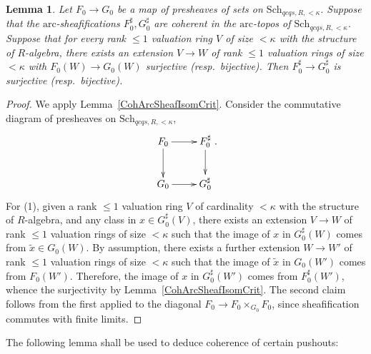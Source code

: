 \documentclass[reqno]{amsart}
\newcommand{\arc}{\mathrm{arc}}
\newtheorem{lemma}[theorem]{Lemma}
\theoremstyle{definition}
\begin{document}
\begin{lemma} 
Let $F_0 \to G_0$ be a map of presheaves of sets on
$\mathrm{Sch}_{qcqs,R, <\kappa}$. Suppose that the $\arc$-sheafifications $F_0^{\sharp},
G_0^{\sharp}$ are coherent in the $\arc$-topos of $\mathrm{Sch}_{qcqs,R, <
\kappa}$. 
Suppose that
for every rank $\leq 1$ valuation 
ring $V$ of size $< \kappa$ with the structure of $R$-algebra, there exists an
extension $V \to W$ of rank $\leq 1$ valuation rings of size $<\kappa$ with
$F_0(W)
\to G_0(W)$ surjective (resp.~bijective). Then $F_0^{\sharp} \to G_0^{\sharp}$
is surjective (resp.~bijective). 
\label{ArcPresheafSheafCrit}
\end{lemma} 
\begin{proof} 
We apply 
Lemma~\ref{CohArcSheafIsomCrit}. 
Consider the commutative diagram of presheaves on 
$\mathrm{Sch}_{qcqs, R, < \kappa}$, 
\[ \xymatrix{
F_0 \ar[d]  \ar[r] &  F_0^{\sharp} \ar[d]  \\
G_0 \ar[r] &  G_0^{\sharp}
}.\]
For (1), given a rank $\leq 1$ valuation ring  $V$ of cardinality
$< \kappa$ with the structure
of $R$-algebra, 
and
any class in $x\in G_0^{\sharp}(V)$, there exists an extension $V \to W$ of rank
$\leq 1$ valuation 
rings of size $<\kappa$
such that the image of $x$ in $G_0^{\sharp}(W)$ comes from
$\widetilde{x} \in G_0(W)$. 
By assumption, there exists a further extension $W \to W'$ of rank $\leq 1$
valuation rings of size $<\kappa$ such that 
the image of $\widetilde{x}$ in $G_0(W')$ comes from $F_0(W')$. 
Therefore, the image of $x$ in $G_0^{\sharp}(W')$ comes from $F_0^{\sharp}(W')$,
whence the surjectivity by 
Lemma~\ref{CohArcSheafIsomCrit}. The second claim 
follows from the first applied to the diagonal $F_0\to F_0 \times_{G_0} F_0$,
since sheafification commutes with finite limits. 
\end{proof} 

The following lemma shall be used to deduce coherence of certain pushouts:
\end{document}

